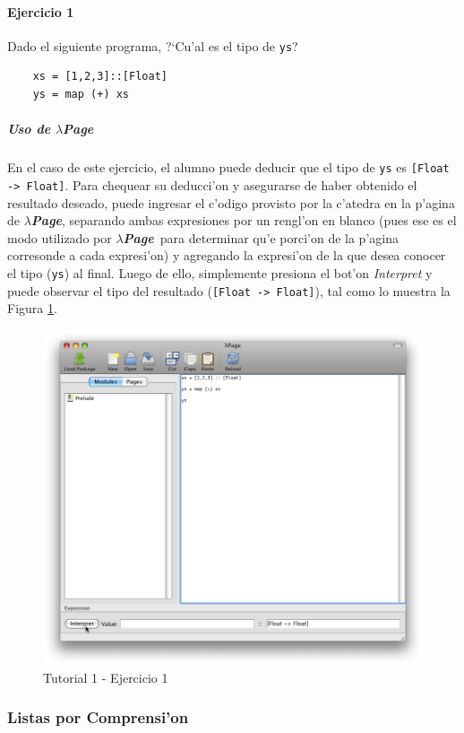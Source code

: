 \documentclass[a4paper]{article}
\newcommand{\hpage}{\textbf{\textsl{$\lambda$Page}}}
\begin{document}
\paragraph{Ejercicio 1}Dado el siguiente programa, ?`Cu'al es el tipo de \texttt{ys}?
\lstset{language=haskell, frame=single, tabsize=4}
\begin{center}\begin{lstlisting}
	xs = [1,2,3]::[Float]
	ys = map (+) xs
\end{lstlisting}\end{center}
\subparagraph{Uso de \hpage}En el caso de este ejercicio, el alumno puede deducir que el tipo de \texttt{ys} es \texttt{[Float -> Float]}.  Para chequear su deducci'on y asegurarse de haber obtenido el resultado deseado, puede ingresar el c'odigo provisto por la c'atedra en la p'agina de \hpage, separando ambas expresiones por un rengl'on en blanco (pues ese es el modo utilizado por \hpage\ para determinar qu'e porci'on de la p'agina corresonde a cada expresi'on) y agregando la expresi'on de la que desea conocer el tipo (\texttt{ys}) al final.  Luego de ello, simplemente presiona el bot'on \textsl{Interpret} y puede observar el tipo del resultado (\texttt{[Float -> Float]}), tal como lo muestra la Figura \ref{tut101}.
\begin{figure}[hp]
	\begin{center}
        	\includegraphics[width=.75\textwidth]{pictures/tut1/01}
		\caption{Tutorial 1 - Ejercicio 1}
		\label{tut101}
	\end{center}
\end{figure}

\newpage
\subsubsection{Listas por Comprensi'on}
\end{document}
